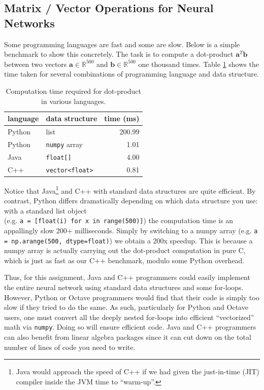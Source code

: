 \documentclass[11pt]{exam}
\numberwithin{equation}{section} %
\numberwithin{figure}{section} %
\numberwithin{table}{section} %
\newcommand{\Rb}{\mathbb{R}}
\newcommand{\av}{\mathbf{a}}
\newcommand{\bv}{\mathbf{b}}
\begin{document}
\subsection{Matrix / Vector Operations for Neural Networks}
\label{sec:vectorize}

Some programming languages are fast and some are slow. Below is a simple benchmark to show this concretely. The task is to compute a dot-product $\av^T \bv$ between two vectors $\av \in \Rb^{500}$ and $\bv \in \Rb^{500}$ one thousand times. Table \ref{tab:dotprod} shows the time taken for several combinations of programming language and data structure. 

\begin{table}[H]
    \begin{center}
    \begin{tabular}{llr}
        \toprule
        {\bf language} & {\bf data structure} & {\bf time (ms)} \\
        \midrule
        Python & list & 200.99 \\
        Python & \texttt{numpy} array & 1.01\\
        Java & \texttt{float[]} & 4.00 \\
        C++ & \texttt{vector<float>} & 0.81\\
        \bottomrule
    \end{tabular}
    \end{center}
    \caption{Computation time required for dot-product in various languages.}
    \label{tab:dotprod}
\end{table}

Notice that Java\footnote{Java would approach the speed of C++ if we had given the just-in-time (JIT) compiler inside the JVM time to ``warm-up''.} and C++ with standard data structures are quite efficient. By contrast, Python differs dramatically depending on which data structure you use: with a standard list object \\(e.g. \lstinline{a = [float(i) for x in range(500)]}) the computation time is an appallingly slow 200+ milliseconds. Simply by switching to a numpy array (e.g. \lstinline{a = np.arange(500, dtype=float)}) we obtain a 200x speedup. This is because a numpy array is actually carrying out the dot-product computation in pure C, which is just as fast as our C++ benchmark, modulo some Python overhead.

Thus, for this assignment, Java and C++ programmers could easily implement the entire neural network using standard data structures and some for-loops. However, Python or Octave programmers would find that their code is simply too slow if they tried to do the same. As such, particularly for Python and Octave users, one must convert all the deeply nested for-loops into efficient ``vectorized'' math via \lstinline{numpy}. Doing so will ensure efficient code. Java and C++ programmers can also benefit from linear algebra packages since it can cut down on the total number of lines of code you need to write.
\end{document}
